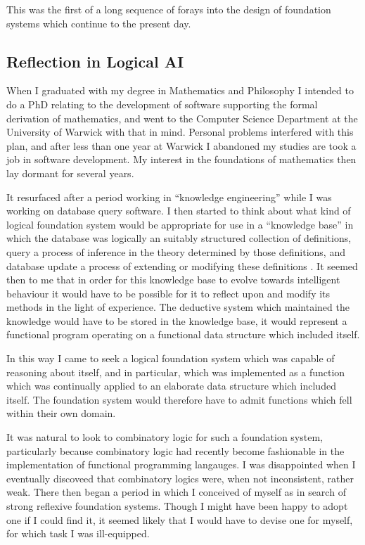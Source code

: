 \documentclass[10pt,titlepage]{book}
\begin{document}
This was the first of a long sequence of forays into the design of foundation systems which continue to the present day.

\subsection{Reflection in Logical AI}

When I graduated with my degree in Mathematics and Philosophy I intended to do a PhD relating to the development of software supporting the formal derivation of mathematics, and went to the Computer Science Department at the University of Warwick with that in mind.
Personal problems interfered with this plan, and after less than one year at Warwick I abandoned my studies are took a job in software development.
My interest in the foundations of mathematics then lay dormant for several years.

It resurfaced after a period working in ``knowledge engineering'' \cite{jones82} while I was working on database query software.
I then started to think about what kind of logical foundation system would be appropriate for use in a ``knowledge base'' in which the database was logically an suitably structured collection of definitions, query a process of inference in the theory determined by those definitions, and database update a process of extending or modifying these definitions \cite{jones85}.
It seemed then to me that in order for this knowledge base to evolve towards intelligent behaviour it would have to be possible for it to reflect upon and modify its methods in the light of experience.
The deductive system which maintained the knowledge would have to be stored in the knowledge base, it would represent a functional program operating on a functional data structure which included itself.

In this way I came to seek a logical foundation system which was capable of reasoning about itself, and in particular, which was implemented as a function which was continually applied to an elaborate data structure which included itself.
The foundation system would therefore have to admit functions which fell within their own domain.

It was natural to look to combinatory logic for such a foundation system, particularly because combinatory logic had recently become fashionable in the implementation of functional programming langauges.
I was disappointed when I eventually discoveed that combinatory logics were, when not inconsistent, rather weak.
There then began a period in which I conceived of myself as in search of strong reflexive foundation systems.
Though I might have been happy to adopt one if I could find it, it seemed likely that I would have to devise one for myself, for which task I was ill-equipped. 
\end{document}

